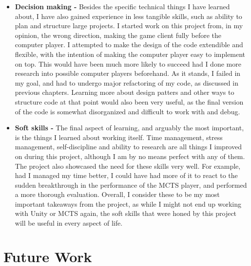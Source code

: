 \begin{itemize}
Besides my research into AI, I had quite a lot to learn about different ways to work with Unity and C\#. This project required me to structure my code somewhat against Unity's design - such as avoiding using \texttt{MonoBehaviour} classes in order to not be fully reliant on the Unity client for things like MCTS rollout simulations. As for C\#, the most useful coding skill I learned was Linq notation, which allows for functional programming-like operations on collections. Since discovering it, I have used it extensively both within this project and outside of it. Finally, I have learned how to use \LaTeX $\ $for this report, and have already used it for several other writing tasks.
\item \textbf{Decision making - } Besides the specific technical things I have learned about, I have also gained experience in less tangible skills, such as ability to plan and structure large projects. I started work on this project from, in my opinion, the wrong direction, making the game client fully before the computer player. I attempted to make the design of the code extendible and flexible, with the intention of making the computer player easy to implement on top. This would have been much more likely to succeed had I done more research into possible computer players beforehand. As it stands, I failed in my goal, and had to undergo major refactoring of my code, as discussed in previous chapters. Learning more about design patters and other ways to structure code at that point would also been very useful, as the final version of the code is somewhat disorganized and difficult to work with and debug.
\item \textbf{Soft skills - } The final aspect of learning, and arguably the most important, is the things I learned about working itself. Time management, stress management, self-discipline and ability to research are all things I improved on during this project, although I am by no means perfect with any of them. The project also showcased the need for these skills very well. For example, had I managed my time better, I could have had more of it to react to the sudden breakthrough in the performance of the MCTS player, and performed a more thorough evaluation. Overall, I consider these to be my most important takeaways from the project, as while I might not end up working with Unity or MCTS again, the soft skills that were honed by this project will be useful in every aspect of life.
\end{itemize}

\section{Future Work}
\label{futureWork}

